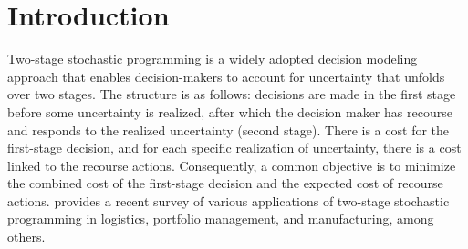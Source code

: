 \section{Introduction}\label{Introduction}

Two-stage stochastic programming is a widely adopted decision modeling approach that enables decision-makers to account for uncertainty that unfolds over two stages. The structure is as follows: decisions are made in the first stage before some uncertainty is realized, after which the decision maker has recourse and responds to the realized uncertainty (second stage). There is a cost for the first-stage decision, and for each specific realization of uncertainty, there is a cost linked to the recourse actions. Consequently, a common objective is to minimize the combined cost of the first-stage decision and the expected cost of recourse actions. \citet{Ntaimo2024} provides a recent survey of various applications of two-stage stochastic programming in logistics, portfolio management, and manufacturing, among others.


